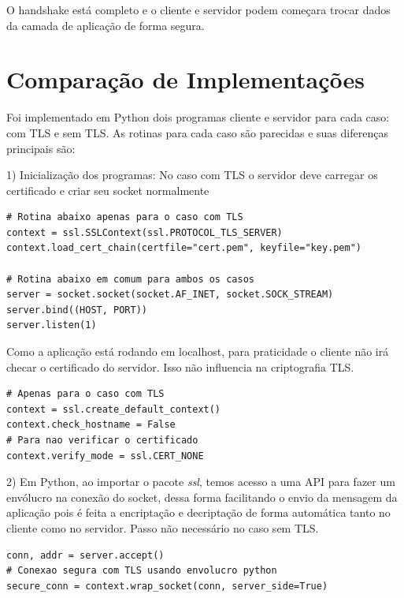 \documentclass[]{article}
\begin{document}
\begin{enumerate}
	O handshake está completo e o cliente e servidor podem começara trocar dados da camada de aplicação de forma segura.
	
%	
\end{enumerate}

\section{Comparação de Implementações}
Foi implementado em Python dois programas cliente e servidor para cada caso: com TLS e sem TLS. As rotinas para cada caso são parecidas e suas diferenças principais são:

1) Inicialização dos programas: No caso com TLS o servidor deve carregar os certificado e criar seu socket normalmente

\begin{lstlisting}[caption={Inicializacao do Servidor}]
# Rotina abaixo apenas para o caso com TLS
context = ssl.SSLContext(ssl.PROTOCOL_TLS_SERVER)
context.load_cert_chain(certfile="cert.pem", keyfile="key.pem")

# Rotina abaixo em comum para ambos os casos
server = socket.socket(socket.AF_INET, socket.SOCK_STREAM)
server.bind((HOST, PORT))
server.listen(1)		
\end{lstlisting}

Como a aplicação está rodando em localhost, para praticidade o cliente não irá checar o certificado do servidor. Isso não influencia na criptografia TLS.

\begin{lstlisting}[caption={Inicializacao do Cliente}]
# Apenas para o caso com TLS
context = ssl.create_default_context()
context.check_hostname = False
# Para nao verificar o certificado
context.verify_mode = ssl.CERT_NONE
\end{lstlisting}

2) Em Python, ao importar o pacote \textit{ssl}, temos acesso a uma API para fazer um envólucro na conexão do socket, dessa forma facilitando o envio da mensagem da aplicação pois é feita a encriptação e decriptação de forma automática tanto no cliente como no servidor. Passo não necessário no caso sem TLS.

\begin{lstlisting}[caption={Conexão do servidor}]
conn, addr = server.accept()
# Conexao segura com TLS usando envolucro python
secure_conn = context.wrap_socket(conn, server_side=True)
\end{lstlisting}
\end{document}
